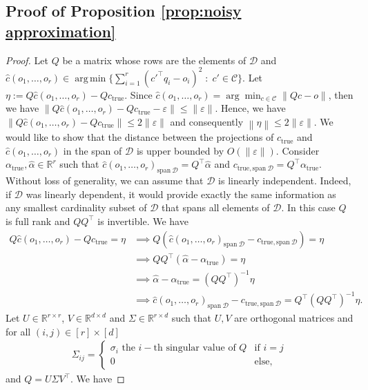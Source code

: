 \documentclass[11pt]{article}
\theoremstyle{plain}
\theoremstyle{definition}
\newcommand{\R}[0]{\mathbb R}
\newcommand{\Vect}{\mathrm{span}~}
\newcommand{\norm}[1]{\left\lVert#1\right\rVert}
\newcommand{\ctrue}[0]{c_{\text{true}}}
\newcommand{\cC}{\mathcal{C}}
\newcommand{\cD}{\mathcal{D}}
\DeclareMathOperator*{\argmin}{arg\,min}
\begin{document}
\subsection{Proof of Proposition \ref{prop:noisy approximation}}
\begin{proof}
Let $Q$ be a matrix whose rows are the elements of $\cD$ and $\hat{c}(o_1,\dots,o_r)\in \argmin \{\sum_{i=1}^{r}(c'^\top q_i - o_i)^2 \; : \; c' \in \cC\}$. Let $\eta := Q\hat{c}(o_1,\dots,o_r) - Q \ctrue$. Since $\hat{c}(o_1,\dots,o_r)=\arg\min_{c\in \cC}\norm{Qc-o}$, then we have $\norm{Q\hat{c}(o_1,\dots,o_r) -Q\ctrue - \varepsilon}\leq \norm{\varepsilon}$. Hence, we have  $\norm{Q\hat{c}(o_1,\dots,o_r) -Q\ctrue}\leq 2\norm{\varepsilon}$ and consequently $\norm{\eta}\leq 2 \norm{\varepsilon}$. 
    We would like to show that the distance between the projections of $\ctrue$ and $\hat{c}(o_1,\dots,o_r)$ in the span of $\cD$ is upper bounded by $O(\norm{\varepsilon})$. Consider $\alpha_{\text{true}},\hat{\alpha}\in \R^r$ such that $\hat{c}(o_1,\dots,o_r)_{\Vect \cD}=Q^\top \hat{\alpha}$ and $c_{\text{true},\Vect \cD}=Q^\top \alpha_{\text{true}}$. Without loss of generality, we can assume that $\cD$ is linearly independent. Indeed, if $\cD$ was linearly dependent, it would provide exactly the same information as any smallest cardinality subset of $\cD$ that spans all elements of $\cD$. In this case $Q$ is full rank and $QQ^\top$ is invertible. We have 
    \begin{align*}
        Q\hat{c}(o_1,\dots,o_r)-Q\ctrue=\eta &\implies Q(\hat{c}(o_1,\dots,o_r)_{\Vect \cD} - c_{\text{true},\Vect \cD})=\eta\\
        &\implies QQ^\top (\hat{\alpha}-\alpha_{\text{true}})=\eta\\
        &\implies \hat{\alpha}-\alpha_{\text{true}}=(QQ^\top)^{-1}\eta\\
        &\implies \hat{c}(o_1,\dots,o_r)_{\Vect \cD}-c_{\text{true},\Vect \cD}=Q^\top (QQ^\top)^{-1}\eta.
    \end{align*}
    Let $U\in \R^{r\times r}$, $V\in \R^{d\times d}$ and $\Sigma\in \R^{r\times d}$ such that $U,V$ are orthogonal matrices and for all $(i,j)\in [r]\times [d]$
    \begin{align*}
        \Sigma_{ij}=\begin{cases}\text{$\sigma_i$ the $i-$th singular value of $Q$} & \text{if }i=j\\ 0 &\text{else,}\end{cases}
    \end{align*}
    and $Q=U\Sigma V^\top$. We have 

\end{proof}
\end{document}
